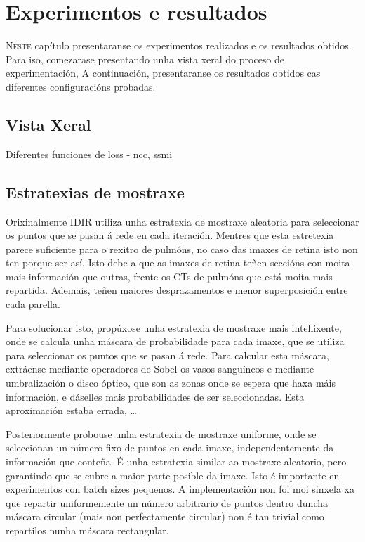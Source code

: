 \chapter{Experimentos e resultados}
\label{chap:Experimentos e resultados}
\lettrine{N}{este} capítulo presentaranse os experimentos realizados e os resultados obtidos.
Para iso, comezarase presentando unha vista xeral do proceso de experimentación, 
A continuación, presentaranse os resultados obtidos cas diferentes configuracións probadas.

\section{Vista Xeral}
\label{sec:Vista Xeral}

Diferentes funciones de loss 
    - ncc, ssmi

\section{Estratexias de mostraxe}
\label{sec:Estratexias de mostraxe}

Orixinalmente IDIR utiliza unha estratexia de mostraxe aleatoria para seleccionar os puntos que se pasan á rede en cada iteración.
Mentres que esta estretexia parece suficiente para o rexitro de pulmóns, no caso das imaxes de retina isto non ten porque ser así.
Isto debe a que as imaxes de retina teñen seccións con moita mais información que outras, frente os CTs de pulmóns que está moita mais repartida.
Ademais, teñen maiores desprazamentos e menor superposición entre cada parella. 

Para solucionar isto, propúxose unha estratexia de mostraxe mais intellixente, onde se calcula unha máscara de probabilidade para cada imaxe, que se utiliza para seleccionar os puntos que se pasan á rede.
Para calcular esta máscara, extráense mediante operadores de Sobel os vasos sanguíneos e mediante umbralización o disco óptico, que son as zonas onde se espera que haxa máis información, e dáselles mais probabilidades de ser seleccionadas.
Esta aproximación estaba errada, \dots

Posteriormente probouse unha estratexia de mostraxe uniforme, onde se seleccionan un número fixo de puntos en cada imaxe, independentemente da información que conteña.
É unha estratexia similar ao mostraxe aleatorio, pero garantindo que se cubre a maior parte posible da imaxe. Isto é importante en experimentos con batch sizes pequenos.
A implementación non foi moi sinxela xa que repartir uniformemente un número arbitrario de puntos dentro duncha máscara circular (mais non perfectamente circular) non é tan trivial como repartilos nunha máscara rectangular.

